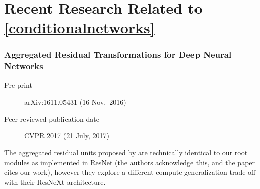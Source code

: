\documentclass[thesis]{subfiles}
\begin{document}



\section{Recent Research Related to \cref{conditionalnetworks}}

\subsubsection*{Aggregated Residual Transformations for Deep Neural Networks}
\begin{description}
    \item[Pre-print] arXiv:1611.05431 (16 Nov.\ 2016)
    \item[Peer-reviewed publication date] CVPR 2017 (21 July, 2017)
\end{description}
The aggregated residual units proposed by \citet{saining2017} are technically identical to our root modules as implemented in ResNet (the authors acknowledge this, and the paper cites our work), however they explore a different compute-generalization trade-off with their ResNeXt architecture. 
\end{document}
